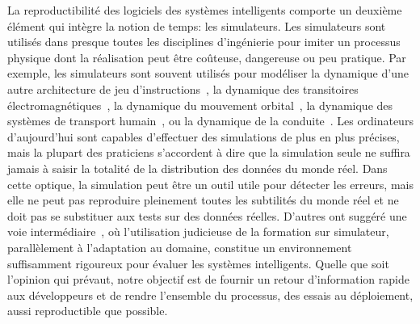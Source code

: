 La reproductibilité des logiciels des systèmes intelligents comporte un deuxième élément qui intègre la notion de temps: les simulateurs. Les simulateurs sont utilisés dans presque toutes les disciplines d'ingénierie pour imiter un processus physique dont la réalisation peut être coûteuse, dangereuse ou peu pratique. Par exemple, les simulateurs sont souvent utilisés pour modéliser la dynamique d'une autre architecture de jeu d'instructions~\citep{bellard2005qemu}, la dynamique des transitoires électromagnétiques~\citep{tavante2018opensi}, la dynamique du mouvement orbital~\citep{bellman1965wengert}, la dynamique des systèmes de transport humain~\citep{ruch2018amodeus}, ou la dynamique de la conduite~\citep{gym_duckietown}. Les ordinateurs d'aujourd'hui sont capables d'effectuer des simulations de plus en plus précises, mais la plupart des praticiens s'accordent à dire que la simulation seule ne suffira jamais à saisir la totalité de la distribution des données du monde réel. Dans cette optique, la simulation peut être un outil utile pour détecter les erreurs, mais elle ne peut pas reproduire pleinement toutes les subtilités du monde réel et ne doit pas se substituer aux tests sur des données réelles. D'autres ont suggéré une voie intermédiaire~\citep{bousmalis2018using}, où l'utilisation judicieuse de la formation sur simulateur, parallèlement à l'adaptation au domaine, constitue un environnement suffisamment rigoureux pour évaluer les systèmes intelligents. Quelle que soit l'opinion qui prévaut, notre objectif est de fournir un retour d'information rapide aux développeurs et de rendre l'ensemble du processus, des essais au déploiement, aussi reproductible que possible.

